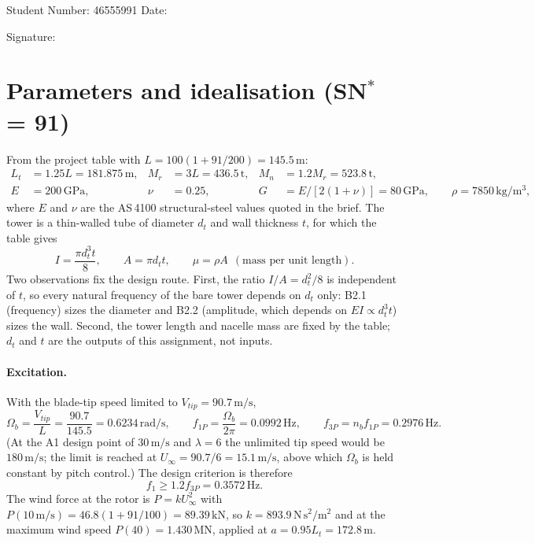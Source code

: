 \documentclass[11pt,a4paper]{article}
\begin{document}
\noindent Student Number: 46555991 \hfill Date: \underline{\hspace{3.5cm}}
\vspace{4mm}

\noindent Signature: \underline{\hspace{6.5cm}}

\newpage
\tableofcontents
\newpage

\section{Parameters and idealisation (SN$^*$ = 91)}
From the project table with $L=100(1+91/200)=145.5\,\mathrm{m}$:
\begin{align*}
L_t&=1.25L=181.875\,\mathrm{m}, & M_r&=3L=436.5\,\mathrm{t}, & M_n&=1.2M_r=523.8\,\mathrm{t},\\
E&=200\,\mathrm{GPa}, & \nu&=0.25, & G&=E/[2(1+\nu)]=80\,\mathrm{GPa}, \qquad \rho=7850\,\mathrm{kg/m^3},
\end{align*}
where $E$ and $\nu$ are the AS\,4100 structural-steel values quoted in the brief. The tower is a thin-walled tube of diameter $d_t$ and wall thickness $t$, for which the table gives
\[
I=\frac{\pi d_t^3 t}{8},\qquad A=\pi d_t t,\qquad \mu=\rho A \ \ (\text{mass per unit length}).
\]
Two observations fix the design route. First, the ratio $I/A=d_t^2/8$ is independent of $t$, so every natural frequency of the bare tower depends on $d_t$ only: B2.1 (frequency) sizes the diameter and B2.2 (amplitude, which depends on $EI\propto d_t^3t$) sizes the wall. Second, the tower length and nacelle mass are fixed by the table; $d_t$ and $t$ are the outputs of this assignment, not inputs.

\paragraph{Excitation.} With the blade-tip speed limited to $V_{tip}=90.7\,\mathrm{m/s}$,
\[
\Omega_b=\frac{V_{tip}}{L}=\frac{90.7}{145.5}=0.6234\,\mathrm{rad/s},\qquad
f_{1P}=\frac{\Omega_b}{2\pi}=0.0992\,\mathrm{Hz},\qquad
f_{3P}=n_b f_{1P}=0.2976\,\mathrm{Hz}.
\]
(At the A1 design point of $30\,\mathrm{m/s}$ and $\lambda=6$ the unlimited tip speed would be $180\,\mathrm{m/s}$; the limit is reached at $U_\infty=90.7/6=15.1\,\mathrm{m/s}$, above which $\Omega_b$ is held constant by pitch control.) The design criterion is therefore
\[
f_1\ge 1.2f_{3P}=0.3572\,\mathrm{Hz}.
\]
The wind force at the rotor is $P=kU_\infty^2$ with $P(10\,\mathrm{m/s})=46.8(1+91/100)=89.39\,\mathrm{kN}$, so $k=893.9\,\mathrm{N\,s^2/m^2}$ and at the maximum wind speed $P(40)=1.430\,\mathrm{MN}$, applied at $a=0.95L_t=172.8\,\mathrm{m}$.
\end{document}

